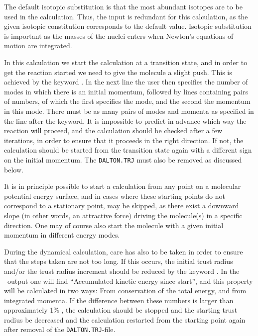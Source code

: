 The default isotopic substitution is that the most abundant
isotopes are to be used in the calculation. Thus, the input
 is redundant for this calculation, as the given
isotopic constitution corresponds to the default value. Isotopic
substitution is important as the masses of the nuclei enters when
Newton's equations of motion are integrated.

In this calculation we start the calculation at a transition
state,
and in order to get the reaction started we need to give the molecule
a slight push. This is achieved by the keyword . In the next
line the user then specifies the number of modes in which there is
 an initial momentum, followed by lines containing pairs of numbers,
of which the first specifies the mode, and the second the momentum in
this mode. There must be as many pairs of modes and momenta as
specified in the line after the  keyword. It is
impossible to predict in advance which way the reaction will proceed,
and the calculation should be checked after a few iterations, in order
to ensure that it proceeds in the right direction. If not, the
calculation should be started from the transition state again with a
different sign on the initial momentum. The
\texttt{DALTON.TRJ} must
also be removed as discussed below.

It is in principle possible to start a calculation from any point on a
molecular potential energy surface, and in cases where these starting points
do not correspond to a stationary point,  may be
skipped, as there exist a downward slope (in other words, an attractive
force) driving the molecule(s) in a specific direction. One may of
course also start the molecule with a given initial momentum in
different energy modes.

During the dynamical calculation, care has also to be taken in order
to ensure that the steps taken are not too long. If this occurs, the
initial trust radius and/or the trust radius increment should be
reduced by the keyword . In the \dalton\ output one will
find ``Accumulated kinetic energy since start'', and this property
will be calculated in two ways: From conservation of the total energy,
and from integrated momenta. If the difference between these numbers
is larger than approximately 1\% , the calculation should be stopped and the
starting trust radius be decreased and the calculation restarted from
the starting point again after removal of the \texttt{DALTON.TRJ}-file.

